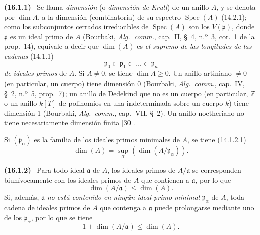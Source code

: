 \documentclass[10pt,oneside]{book}
\makeatletter
\newcommand{\setmanualcurrentlabel}[1]{\def\@currentlabel{#1}}
\newenvironment{env}[1][]{\setmanualcurrentlabel{#1}\par\medskip\noindent\textbf{(#1)}\ }{\par}
\makeatother
\begin{document}
\begin{env}[16.1.1]
\label{0.16.1.1-es}
Se llama \emph{dimensión} (o \emph{dimensión de Krull}) de un anillo $A$, y se denota por
$\dim A$, a la dimensión (combinatoria) de su espectro
$\operatorname{Spec}(A)$ (14.2.1); como los subconjuntos cerrados irreducibles
de $\operatorname{Spec}(A)$ son los
$V(\mathfrak{p})$, donde $\mathfrak{p}$ es un ideal primo de $A$ (Bourbaki,
\emph{Alg.~comm.}, cap.~II, \S~4, n.º~3, cor.~1 de la prop.~14), equivale a
decir que $\dim(A)$ es \emph{el supremo de las longitudes de las cadenas} (14.1.1)
\[
  \mathfrak{p}_0\subset\mathfrak{p}_1\subset\ldots\subset\mathfrak{p}_n
\]
\emph{de ideales primos} de $A$. Si $A\neq0$, se tiene $\dim A\geq0$. Un anillo
artiniano $\neq0$ (en particular, un cuerpo) tiene dimensión 0 (Bourbaki,
\emph{Alg.~comm.}, cap.~IV, \S~2, n.º~5, prop.~7); un anillo de Dedekind que
no es un cuerpo (en particular, $\mathbb{Z}$ o un anillo $k[T]$ de polinomios
en una indeterminada sobre un cuerpo $k$) tiene dimensión 1 (Bourbaki,
\emph{Alg.~comm.}, cap.~VII, \S~2). Un anillo noetheriano no tiene
necesariamente dimensión finita [30].

Si $(\mathfrak{p}_\alpha)$ es la familia de los ideales primos minimales de
$A$, se tiene (14.1.2.1)
\[
\label{0.16.1.1.1-es}
  \dim(A)=\sup_\alpha(\dim(A/\mathfrak{p}_\alpha)).
\tag{16.1.1.1}
\]
\end{env}

\begin{env}[16.1.2]
\label{0.16.1.2-es}
Para todo ideal $\mathfrak{a}$ de $A$, los ideales primos de
$A/\mathfrak{a}$ se corresponden biunívocamente con los ideales primos de $A$
que contienen a $\mathfrak{a}$, por lo que
\[
\label{0.16.1.2.1-es}
  \dim(A/\mathfrak{a})\leq\dim(A).
\tag{16.1.2.1}
\]
Si, además, $\mathfrak{a}$ \emph{no está contenido en ningún ideal primo minimal}
$\mathfrak{p}_\alpha$ de $A$, toda cadena de ideales primos de $A$ que
contenga a $\mathfrak{a}$ puede prolongarse mediante uno de los
$\mathfrak{p}_\alpha$, por lo que se tiene
\[
\label{0.16.1.2.2-es}
  1+\dim(A/\mathfrak{a})\leq\dim(A).
\tag{16.1.2.2}
\]
\end{env}
\end{document}
